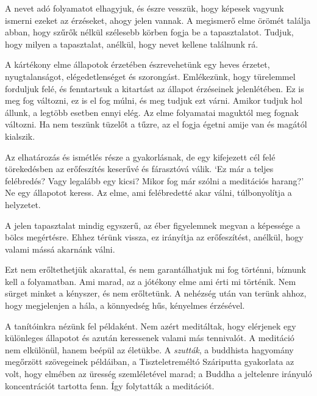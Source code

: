 A nevet adó folyamatot elhagyjuk, és észre vesszük, hogy képesek vagyunk
ismerni ezeket az érzéseket, ahogy jelen vannak. A megismerő elme örömét
találja abban, hogy szűrők nélkül szélesebb körben fogja be a
tapasztalatot. Tudjuk, hogy milyen a tapasztalat, anélkül, hogy nevet
kellene találnunk rá.

A kártékony elme állapotok érzetében észrevehetünk egy heves érzetet,
nyugtalanságot, elégedetlenséget és szorongást. Emlékezünk, hogy
türelemmel forduljuk felé, és fenntartsuk a kitartást az állapot
érzéseinek jelenlétében. Ez is meg fog változni, ez is el fog múlni, és
meg tudjuk ezt várni. Amikor tudjuk hol állunk, a legtöbb esetben ennyi
elég. Az elme folyamatai maguktól meg fognak változni. Ha nem teszünk
tüzelőt a tűzre, az el fogja égetni amije van és magától kialszik.

Az elhatározás és ismétlés része a gyakorlásnak, de egy kifejezett cél
felé törekedésben az erőfeszítés keserűvé és fárasztóvá válik. `Ez már a
teljes felébredés? Vagy legalább egy kicsi? Mikor fog már szólni a
meditációs harang?' Ne egy állapotot keress. Az elme, ami felébredetté
akar válni, túlbonyolítja a helyzetet.

A jelen tapasztalat mindig egyszerű, az éber figyelemnek megvan a
képessége a bölcs megértésre. Ehhez térünk vissza, ez irányítja az
erőfeszítést, anélkül, hogy valami mássá akarnánk válni.

Ezt nem erőltethetjük akarattal, és nem garantálhatjuk mi fog történni,
bíznunk kell a folyamatban. Ami marad, az a jótékony elme ami érti mi
történik. Nem sürget minket a kényszer, és nem erőltetünk. A nehézség
után van terünk ahhoz, hogy megjelenjen a hála, a könnyedség hűs,
kényelmes érzésével.

A tanítóinkra nézünk fel példaként. Nem azért meditáltak, hogy elérjenek
egy különleges állapotot és azután keressenek valami más tennivalót. A
meditáció nem elkülönül, hanem beépül az életükbe. A \emph{szutták}, a
buddhista hagyomány megőrzött szövegeinek példáiban, a Tiszteletreméltó
Száriputta gyakorlata az volt, hogy elmében az üresség szemléletével
marad; a Buddha a jeltelenre irányuló koncentrációt tartotta fenn. Így
folytatták a meditációt.
